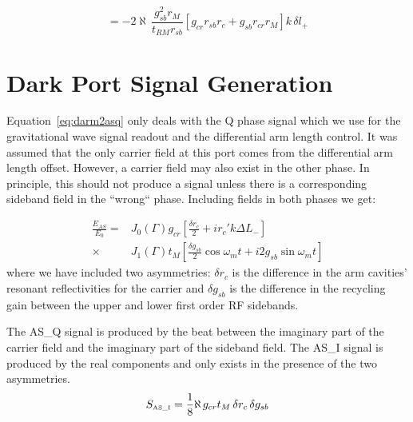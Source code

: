 \begin{equation}
[ l_{+} \rightsquigarrow  POB\_I ] = - 2 \aleph \, \frac{g_{sb}^2 r_M}{t_{RM}r_{sb}}
                           \left [ g_{cr} r_{sb} r_c + g_{sb} r_{cr} r_M \right ]
                           k \, \delta l_{+}
\end{equation}


\section{Dark Port Signal Generation}
\label{sec:darksignals}

Equation~\ref{eq:darm2asq} only deals with the Q phase signal which we use for
the gravitational wave signal readout and the differential arm length control.
It was assumed that the only carrier field at this port comes from the differential
arm length offset. However, a carrier field may also exist in the other phase.
In principle, this should not produce a signal unless there is a corresponding
sideband field in the ``wrong`` phase. Including fields in both phases we get:

\begin{equation}
 \begin{split}
  \frac{E_{AS}}{E_{0}} =& J_{0}(\Gamma) g_{cr} \left [ \frac{\delta r_c}{2} 
                                         + i r_{c}' k \Delta L_- \right ] \\
 \times & J_{1}(\Gamma) t_{M} \left [ \frac{\delta g_{sb}}{2} \cos{\omega_{m} t}
                           + i 2 g_{sb} \sin{\omega_{m} t} \right ]
 \end{split}
\end{equation}
where we have included two asymmetries: $\delta r_c$ is the difference in the
arm cavities' resonant reflectivities for the carrier and $\delta g_{sb}$ is
the difference in the recycling gain between the upper and lower 
first order RF sidebands.

The AS\_Q signal is produced by the beat between the imaginary part of the
carrier field and the imaginary part of the sideband field. The AS\_I signal
is produced by the real components and only exists in the presence of the
two asymmetries.
\begin{equation}
S_{\mbox{\tiny AS\_I}} = \frac{1}{8} \aleph \, g_{cr} t_{M} 
                         \, \delta r_c \, \delta g_{sb}
\label{eq:ASI}
\end{equation}

